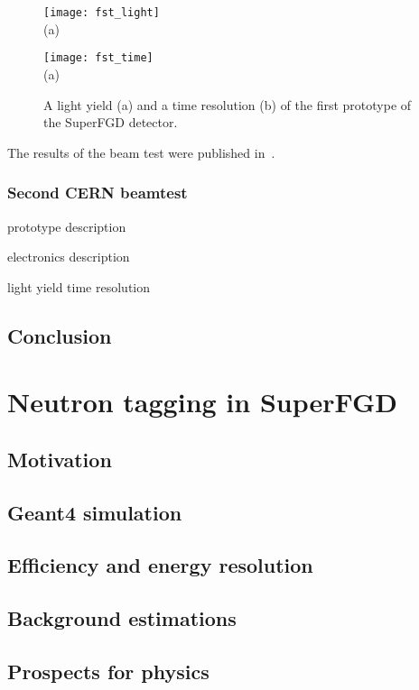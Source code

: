 \documentclass[main.tex]{subfiles}
\begin{document}
\begin{figure}[!ht]
	\centering
	\begin{minipage}{0.49\linewidth}
		\centering
		\texttt{[image: fst\_light]} \\ (a)
	\end{minipage}
	\begin{minipage}{0.49\linewidth}
		\centering
		\texttt{[image: fst\_time]} \\ (a)
	\end{minipage}
	\caption{A light yield (a) and a time resolution (b) of the first prototype of the SuperFGD detector.}
	\label{fig:up:sfgd:1st_res}
\end{figure}

The results of the beam test were published in~\cite{Mineev2019}.

\subsection{Second CERN beamtest}
\label{sec:up:sfgd:beam2}

prototype description

electronics description

light yield
time resolution

\section{Conclusion}








\chapter{Neutron tagging in SuperFGD}
\label{ch:up:neutron}
\section{Motivation}
\section{Geant4 simulation}
\section{Efficiency and energy resolution}
\section{Background estimations}
\section{Prospects for physics}
\end{document}
